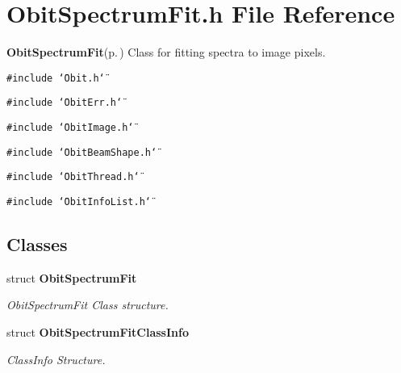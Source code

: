 \section{Obit\-Spectrum\-Fit.h File Reference}
\label{ObitSpectrumFit_8h}
{\bf Obit\-Spectrum\-Fit}{\rm (p.\,\pageref{structObitSpectrumFit})} Class for fitting spectra to image pixels. 

{\tt \#include \char`\"{}Obit.h\char`\"{}}\par
{\tt \#include \char`\"{}Obit\-Err.h\char`\"{}}\par
{\tt \#include \char`\"{}Obit\-Image.h\char`\"{}}\par
{\tt \#include \char`\"{}Obit\-Beam\-Shape.h\char`\"{}}\par
{\tt \#include \char`\"{}Obit\-Thread.h\char`\"{}}\par
{\tt \#include \char`\"{}Obit\-Info\-List.h\char`\"{}}\par
\subsection*{Classes}
\begin{CompactItemize}
\item 
struct {\bf Obit\-Spectrum\-Fit}
\begin{CompactList}\small\item\em Obit\-Spectrum\-Fit Class structure. \item\end{CompactList}\item 
struct {\bf Obit\-Spectrum\-Fit\-Class\-Info}
\begin{CompactList}\small\item\em Class\-Info Structure. \item\end{CompactList}\end{CompactItemize}
